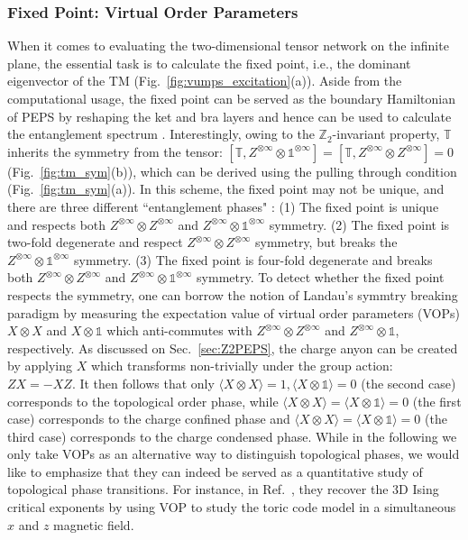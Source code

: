 \documentclass{ntuthesis}
\newcommand{\citep}{\cite}
\begin{document}
\subsubsection{Fixed Point: Virtual Order Parameters}
\label{subsubsec:fixed-point}
When it comes to evaluating the two-dimensional tensor network on the infinite plane, the essential task is to calculate the fixed point, i.e., the dominant eigenvector of the TM (Fig.~\ref{fig:vumps_excitation}(a)). Aside from the computational usage, the fixed point can be served as the boundary Hamiltonian of PEPS by reshaping the ket and bra layers and hence can be used to calculate the entanglement spectrum \citep{2011_entanglement}. 
%
Interestingly, owing to the $\mathbb{Z}_2$-invariant property, $\mathbb{T}$ inherits the symmetry from the tensor: $ [\mathbb{T}, Z^{\otimes \infty} \otimes \mathbb{1}^{\otimes \infty}] = [\mathbb{T},  Z^{\otimes \infty}\otimes Z^{\otimes \infty} ]  = 0$ (Fig.~\ref{fig:tm_sym}(b)), which can be derived using the pulling through condition (Fig.~\ref{fig:tm_sym}(a)). 
%
In this scheme, the fixed point may not be unique, and there are three different ``entanglement phases" \citep{2017_anyon_condensates}: 
%
(1) The fixed point is unique and respects both $ Z^{\otimes \infty}\otimes Z^{\otimes \infty} $ and $Z^{\otimes \infty} \otimes \mathbb{1}^{\otimes \infty}$ symmetry. 
%
(2) The fixed point is two-fold degenerate and respect $Z^{\otimes \infty}\otimes Z^{\otimes \infty} $ symmetry, but breaks the $Z^{\otimes \infty} \otimes \mathbb{1}^{\otimes \infty}$ symmetry. 
%
(3) The fixed point is four-fold degenerate and breaks both $ Z^{\otimes \infty}\otimes Z^{\otimes \infty} $ and $Z^{\otimes \infty} \otimes \mathbb{1}^{\otimes \infty}$ symmetry. 
%
To detect whether the fixed point respects the symmetry, one can borrow the notion of Landau's symmtry breaking paradigm by measuring the expectation value of virtual order parameters (VOPs) $ X \otimes X $ and $ X \otimes \mathbb{1} $ which anti-commutes with $ Z^{\otimes \infty}\otimes Z^{\otimes \infty} $ and $Z^{\otimes \infty} \otimes \mathbb{1}$, respectively. 
%
As discussed on Sec.~\ref{sec:Z2PEPS}, the charge anyon can be created by applying $X$ which transforms non-trivially under the group action: $ZX = -XZ$. It then follows that only $\langle X \otimes X  \rangle = 1,\langle X \otimes \mathbb{1}  \rangle = 0$ (the second case) corresponds to the topological order phase, while $\langle X \otimes X  \rangle = \langle X \otimes \mathbb{1}  \rangle = 0$ (the first case) corresponds to the charge confined phase and $\langle X \otimes X  \rangle = \langle X \otimes \mathbb{1}  \rangle = 0$ (the third case) corresponds to the charge condensed phase.
%
While in the following we only take VOPs as an alternative way to distinguish topological phases, we would like to emphasize that they can indeed be served as a quantitative study of topological phase transitions. For instance, in Ref.~\citep{2020_order_parameter}, they recover the 3D Ising critical exponents by using VOP to study the toric code model in a simultaneous $x$ and $z$ magnetic field.
\end{document}
